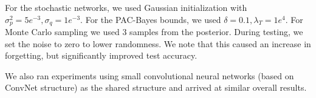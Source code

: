 \documentclass{article}
\theoremstyle{plain}
\theoremstyle{definition}
\theoremstyle{remark}
\begin{document}
For the stochastic networks, we used Gaussian initialization with $\sigma_p^2=5e^{-3}, \sigma_q=1e^{-3}$. For the PAC-Bayes bounds, we used $\delta=0.1, \lambda_T=1e^4$. For Monte Carlo sampling we used $3$ samples from the posterior. During testing, we set the noise to zero to lower randomness. We note that this caused an increase in forgetting, but significantly improved test accuracy.

We also ran experiments using small convolutional neural networks (based on ConvNet structure) as the shared structure and arrived at similar overall results.
 
\end{document}
